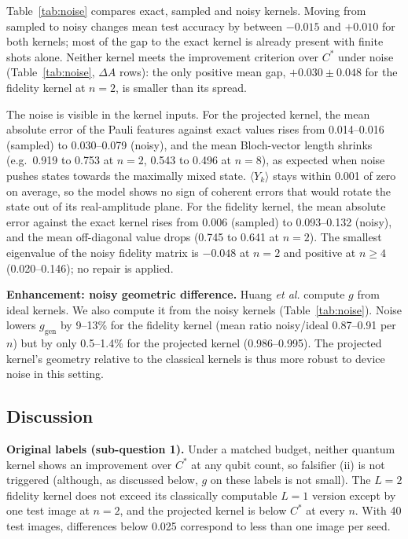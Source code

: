 \documentclass[conference]{IEEEtran}
\begin{document}
Table~\ref{tab:noise} compares exact, sampled and noisy kernels. Moving from sampled to noisy changes mean test accuracy by between $-0.015$ and $+0.010$ for both kernels; most of the gap to the exact kernel is already present with finite shots alone. Neither kernel meets the improvement criterion over $C^\ast$ under noise (Table~\ref{tab:noise}, $\Delta A$ rows): the only positive mean gap, $+0.030\pm0.048$ for the fidelity kernel at $n=2$, is smaller than its spread.

The noise is visible in the kernel inputs. For the projected kernel, the mean absolute error of the Pauli features against exact values rises from 0.014--0.016 (sampled) to 0.030--0.079 (noisy), and the mean Bloch-vector length shrinks (e.g.\ 0.919 to 0.753 at $n=2$, 0.543 to 0.496 at $n=8$), as expected when noise pushes states towards the maximally mixed state. $\langle Y_k\rangle$ stays within 0.001 of zero on average, so the model shows no sign of coherent errors that would rotate the state out of its real-amplitude plane. For the fidelity kernel, the mean absolute error against the exact kernel rises from 0.006 (sampled) to 0.093--0.132 (noisy), and the mean off-diagonal value drops (0.745 to 0.641 at $n=2$). The smallest eigenvalue of the noisy fidelity matrix is $-0.048$ at $n=2$ and positive at $n\ge4$ (0.020--0.146); no repair is applied.

\textbf{Enhancement: noisy geometric difference.} Huang \textit{et al.} compute $g$ from ideal kernels. We also compute it from the noisy kernels (Table~\ref{tab:noise}). Noise lowers $g_{\mathrm{gen}}$ by 9--13\% for the fidelity kernel (mean ratio noisy/ideal 0.87--0.91 per $n$) but by only 0.5--1.4\% for the projected kernel (0.986--0.995). The projected kernel's geometry relative to the classical kernels is thus more robust to device noise in this setting.


\subsection{Discussion}\label{sec:disc}
\textbf{Original labels (sub-question 1).} Under a matched budget, neither quantum kernel shows an improvement over $C^\ast$ at any qubit count, so falsifier (ii) is not triggered (although, as discussed below, $g$ on these labels is not small). The $L=2$ fidelity kernel does not exceed its classically computable $L=1$ version except by one test image at $n=2$, and the projected kernel is below $C^\ast$ at every $n$. With 40 test images, differences below 0.025 correspond to less than one image per seed.
\end{document}
